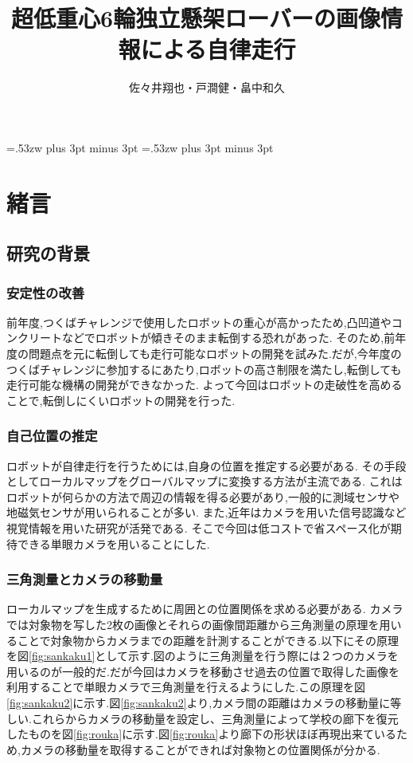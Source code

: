 \documentclass[12pt,oneside]{sotsuken_paper}
\title{超低重心6輪独立懸架ローバーの画像情報による自律走行}
\author{佐々井翔也・戸澗健・畠中和久}
\begin{document}
\setlength{\baselineskip}{9truemm}

\kanjiskip=.53zw plus 3pt minus 3pt
\xkanjiskip=.53zw plus 3pt minus 3pt

\tableofcontents


\chapter{緒言}
\section{研究の背景}

\subsection{安定性の改善}
前年度,つくばチャレンジで使用したロボットの重心が高かったため,凸凹道やコンクリートなどでロボットが傾きそのまま転倒する恐れがあった.
そのため,前年度の問題点を元に転倒しても走行可能なロボットの開発を試みた.だが,今年度のつくばチャレンジに参加するにあたり,ロボットの高さ制限を満たし,転倒しても走行可能な機構の開発ができなかった.
よって今回はロボットの走破性を高めることで,転倒しにくいロボットの開発を行った.
\subsection{自己位置の推定}
ロボットが自律走行を行うためには,自身の位置を推定する必要がある.
その手段としてローカルマップをグローバルマップに変換する方法が主流である.
これはロボットが何らかの方法で周辺の情報を得る必要があり,一般的に測域センサや地磁気センサが用いられることが多い.
また,近年はカメラを用いた信号認識など視覚情報を用いた研究が活発である.
そこで今回は低コストで省スペース化が期待できる単眼カメラを用いることにした.
\subsection{三角測量とカメラの移動量}
ローカルマップを生成するために周囲との位置関係を求める必要がある.
カメラでは対象物を写した2枚の画像とそれらの画像間距離から三角測量の原理を用いることで対象物からカメラまでの距離を計測することができる.以下にその原理を図\ref{fig:sankaku1}として示す.図のように三角測量を行う際には２つのカメラを用いるのが一般的だ.だが今回はカメラを移動させ過去の位置で取得した画像を利用することで単眼カメラで三角測量を行えるようにした.この原理を図\ref{fig:sankaku2}に示す.図\ref{fig:sankaku2}より,カメラ間の距離はカメラの移動量に等しい.これらからカメラの移動量を設定し、三角測量によって学校の廊下を復元したものを図\ref{fig:rouka}に示す.図\ref{fig:rouka}より廊下の形状ほぼ再現出来ているため,カメラの移動量を取得することができれば対象物との位置関係が分かる.
\end{document}
